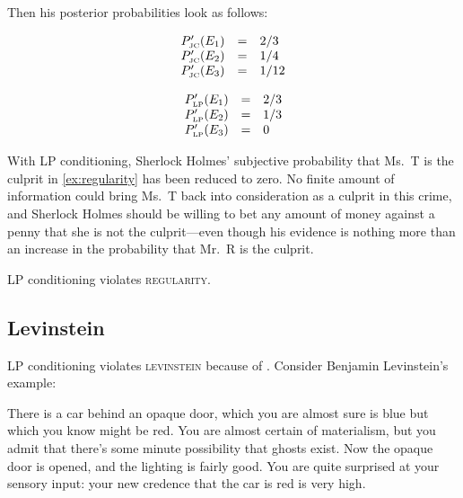 \documentclass[smallextended]{svjour3}       %
\begin{document}
Then his posterior probabilities look as follows:

\begin{equation}
  \label{eq:sherlockposteriorjcreg}
  \begin{array}{rcl}
  P'_{\mbox{\tiny JC}}(E_{1})&=&2/3\\
  P'_{\mbox{\tiny JC}}(E_{2})&=&1/4\\
  P'_{\mbox{\tiny JC}}(E_{3})&=&1/12
\end{array}
\end{equation}

\begin{equation}
  \label{eq:sherlockposteriorlpreg}
  \begin{array}{rcl}
  P'_{\mbox{\tiny LP}}(E_{1})&=&2/3\\
  P'_{\mbox{\tiny LP}}(E_{2})&=&1/3\\
  P'_{\mbox{\tiny LP}}(E_{3})&=&0
\end{array}
\end{equation}

With LP conditioning, Sherlock Holmes' subjective probability that
Ms.\ T is the culprit in {\xample} \ref{ex:regularity} has been reduced
to zero. No finite amount of information could bring Ms.\ T back into
consideration as a culprit in this crime, and Sherlock Holmes should
be willing to bet any amount of money against a penny that she is not
the culprit---even though his evidence is nothing more than an
increase in the probability that Mr.\ R is the culprit.

LP conditioning violates \textsc{regularity}.

\subsection{Levinstein}
\label{Levinstein}

LP conditioning violates \textsc{levinstein} because of 
. Consider Benjamin Levinstein's example:

\begin{quotex}
  \label{ex:levinstein} There is a car
  behind an opaque door, which you are almost sure is blue but which
  you know might be red. You are almost certain of materialism, but
  you admit that there's some minute possibility that ghosts exist.
  Now the opaque door is opened, and the lighting is fairly good. You
  are quite surprised at your sensory input: your new credence that
  the car is red is very high.
\end{quotex}
\end{document}
